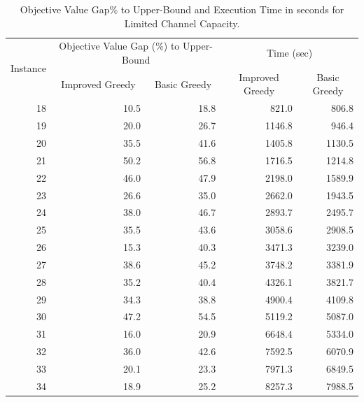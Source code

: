 \documentclass[11pt]{article}
\begin{document}
\begin{table}[htbp]
  \centering
  \caption{Objective Value Gap\% to Upper-Bound and Execution Time in seconds for Limited Channel Capacity.}\label{table:tbl_ub_limited_results}
  \begin{adjustbox}{max width=1\textwidth}
    \begin{tabular}{|r|rrrr|}
    \toprule
    \multicolumn{1}{|c|}{\multirow{2}[4]{*}{Instance}} & \multicolumn{2}{c|}{Objective Value Gap (\%) to Upper-Bound} & \multicolumn{2}{c|}{Time (sec)} \\
\cmidrule{2-5}          & \multicolumn{1}{c}{Improved Greedy} & \multicolumn{1}{c|}{Basic Greedy} & \multicolumn{1}{c}{Improved Greedy} & \multicolumn{1}{c|}{Basic Greedy} \\
    \midrule
    18    & 10.5  & \multicolumn{1}{r|}{18.8} & 821.0 & 806.8 \\
    19    & 20.0  & \multicolumn{1}{r|}{26.7} & 1146.8 & 946.4 \\
    20    & 35.5  & \multicolumn{1}{r|}{41.6} & 1405.8 & 1130.5 \\
    21    & 50.2  & \multicolumn{1}{r|}{56.8} & 1716.5 & 1214.8 \\
    22    & 46.0  & \multicolumn{1}{r|}{47.9} & 2198.0 & 1589.9 \\
    23    & 26.6  & \multicolumn{1}{r|}{35.0} & 2662.0 & 1943.5 \\
    24    & 38.0  & \multicolumn{1}{r|}{46.7} & 2893.7 & 2495.7 \\
    25    & 35.5  & \multicolumn{1}{r|}{43.6} & 3058.6 & 2908.5 \\
    26    & 15.3  & \multicolumn{1}{r|}{40.3} & 3471.3 & 3239.0 \\
    27    & 38.6  & \multicolumn{1}{r|}{45.2} & 3748.2 & 3381.9 \\
    28    & 35.2  & \multicolumn{1}{r|}{40.4} & 4326.1 & 3821.7 \\
    29    & 34.3  & \multicolumn{1}{r|}{38.8} & 4900.4 & 4109.8 \\
    30    & 47.2  & \multicolumn{1}{r|}{54.5} & 5119.2 & 5087.0 \\
    31    & 16.0  & \multicolumn{1}{r|}{20.9} & 6648.4 & 5334.0 \\
    32    & 36.0  & \multicolumn{1}{r|}{42.6} & 7592.5 & 6070.9 \\
    33    & 20.1  & \multicolumn{1}{r|}{23.3} & 7971.3 & 6849.5 \\
    34    & 18.9  & \multicolumn{1}{r|}{25.2} & 8257.3 & 7988.5 \\

\end{tabular}
\end{adjustbox}
\end{table}
\end{document}
